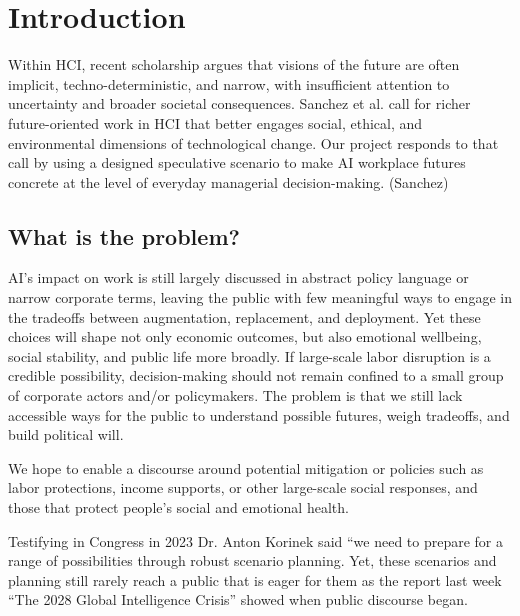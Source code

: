 \documentclass[sigconf,authordraft]{acmart}
\begin{document}

\maketitle

\section{Introduction}

Within HCI, recent scholarship argues that visions of the future are often implicit, techno-deterministic, and narrow, with insufficient attention to uncertainty and broader societal consequences. Sanchez et al. call for richer future-oriented work in HCI that better engages social, ethical, and environmental dimensions of technological change. Our project responds to that call by using a designed speculative scenario to make AI workplace futures concrete at the level of everyday managerial decision-making. (Sanchez)


\subsection{What is the problem?}


AI’s impact on work is still largely discussed in abstract policy language or narrow corporate terms, leaving the public with few meaningful ways to engage in the tradeoffs between augmentation, replacement, and deployment. Yet these choices will shape not only economic outcomes, but also emotional wellbeing, social stability, and public life more broadly. If large-scale labor disruption is a credible possibility, decision-making should not remain confined to a small group of corporate actors and/or policymakers. The problem is that we still lack accessible ways for the public to understand possible futures, weigh tradeoffs, and build political will. 

We hope to enable a discourse around potential mitigation or policies such as labor protections, income supports, or other large-scale social responses, and those that protect people's social and emotional health.

Testifying in Congress in 2023 Dr. Anton Korinek said “we need to prepare for a range of possibilities through robust scenario planning. Yet, these scenarios and planning still rarely reach a public that is eager for them as the report last week “The 2028 Global Intelligence Crisis” showed when public discourse began. 
\end{document}
